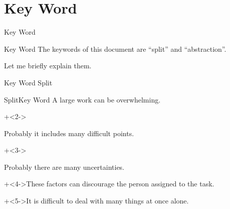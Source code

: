 %
%

\section{Key Word}


\begin{frame}{}{}
    {\Huge Key Word}
\end{frame}


\begin{frame}{Key Word}{}
    The keywords of this document are ``split'' and ``abstraction''.
    \vspace{4ex}

    Let me briefly explain them.
\end{frame}


\begin{frame}{Key Word}{}
    {\Huge Split}
\end{frame}


\begin{frame}{Split}{Key Word}
    A large work can be overwhelming.
    \vspace{4ex}

    \begin{itemize}
        \onslide+<2->{\item Probably it includes many difficult points.}
        \onslide+<3->{\item Probably there are many uncertainties.}
    \end{itemize}
    \vspace{4ex}

    \onslide+<4->{These factors can discourage the person assigned to the task.}
    \vspace{4ex}

    \onslide+<5->{It is difficult to deal with many things at once alone.}
\end{frame}


